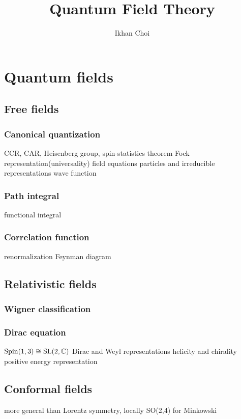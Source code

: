 \documentclass{../../large}
\begin{document}
\title{Quantum Field Theory}
\author{Ikhan Choi}
\maketitle
\tableofcontents


\part{Quantum fields}

\chapter{Free fields}
\section{Canonical quantization}
CCR, CAR, Heisenberg group, spin-statistics theorem
Fock representation(universality)
field equations
particles and irreducible representations
wave function
\section{Path integral}
functional integral
\section{Correlation function}
renormalization
Feynman diagram



\chapter{Relativistic fields}
\section{Wigner classification}
\section{Dirac equation}
$\mathrm{Spin}(1,3)\cong\mathrm{SL}(2,\mathbb{C})$
Dirac and Weyl representations
helicity and chirality
positive energy representation







\chapter{Conformal fields}
more general than Lorentz symmetry, locally SO(2,4) for Minkowski
\end{document}
